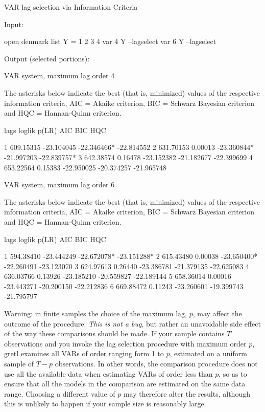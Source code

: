 \begin{script}[htbp]
  \caption{VAR lag selection via Information Criteria}
  \label{script:var-lagselect}
Input:
\begin{scodebit}
open denmark
list Y = 1 2 3 4
var 4 Y --lagselect
var 6 Y --lagselect
\end{scodebit}
Output (selected portions):
\begin{scodebit}
VAR system, maximum lag order 4

The asterisks below indicate the best (that is, minimized) values
of the respective information criteria, AIC = Akaike criterion,
BIC = Schwarz Bayesian criterion and HQC = Hannan-Quinn criterion.

lags        loglik    p(LR)       AIC          BIC          HQC

   1     609.15315           -23.104045   -22.346466*  -22.814552 
   2     631.70153  0.00013  -23.360844*  -21.997203   -22.839757*
   3     642.38574  0.16478  -23.152382   -21.182677   -22.399699 
   4     653.22564  0.15383  -22.950025   -20.374257   -21.965748 

VAR system, maximum lag order 6

The asterisks below indicate the best (that is, minimized) values
of the respective information criteria, AIC = Akaike criterion,
BIC = Schwarz Bayesian criterion and HQC = Hannan-Quinn criterion.

lags        loglik    p(LR)       AIC          BIC          HQC

   1     594.38410           -23.444249   -22.672078*  -23.151288*
   2     615.43480  0.00038  -23.650400*  -22.260491   -23.123070 
   3     624.97613  0.26440  -23.386781   -21.379135   -22.625083 
   4     636.03766  0.13926  -23.185210   -20.559827   -22.189144 
   5     658.36014  0.00016  -23.443271   -20.200150   -22.212836 
   6     669.88472  0.11243  -23.260601   -19.399743   -21.795797 
\end{scodebit}
\end{script}

Warning: in finite samples the choice of the maximum lag, $p$, may
affect the outcome of the procedure. \textit{This is not a bug}, but
rather an unavoidable side effect of the way these comparisons should
be made. If your sample contains $T$ observations and you invoke the
lag selection procedure with maximum order $p$, gretl examines
all VARs of order ranging form 1 to $p$, estimated on a uniform sample
of $T-p$ observations. In other words, the comparison procedure does
not use all the available data when estimating VARs of order less than
$p$, so as to ensure that all the models in the comparison are
estimated on the same data range. Choosing a different value of $p$
may therefore alter the results, although this is unlikely to happen
if your sample size is reasonably large.


